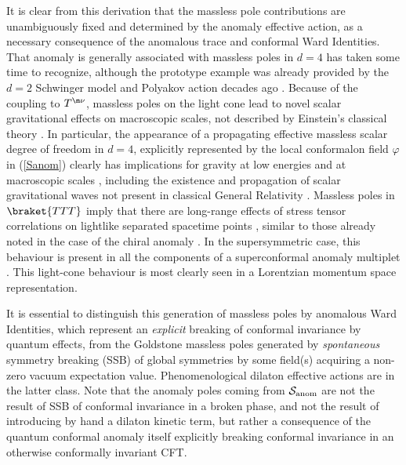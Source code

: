 \documentclass[a4paper,11pt,openright,twoside]{book}
\let\n=\nu      \let\x=\xi     \let\p=\pi      \let\r=\rho
\numberwithin{equation}{section}
\begin{document}
{{It is clear from this derivation that the massless pole contributions are unambiguously fixed and 
determined by the anomaly effective action, as a necessary consequence of the anomalous trace and conformal Ward Identities. 
That anomaly is generally associated with massless poles in $d=4$ has taken some time to recognize, although the prototype example was already provided by the $d=2$ Schwinger model and Polyakov action decades ago \cite{Blaschke:2014ioa}. Because of the coupling 
to $T^{\m\n}$, massless poles on the light cone lead to novel scalar gravitational effects on macroscopic scales, 
not described by Einstein's classical theory \cite{Mottola:2016mpl, Mottola:2006ew,AndMolMott:2003,Meissner:2016onk}. 
In particular, the appearance of a propagating effective massless scalar degree of freedom in $d=4$, explicitly represented by the local 
conformalon field $\varphi$ in (\ref{Sanom}) clearly has implications for gravity at low energies and at macroscopic scales \cite{Mottola:2006ew}, 
including the existence and propagation of scalar gravitational waves not present in classical General Relativity \cite{Mottola:2016mpl}.
Massless poles in $\braket{TTT}$ imply that there are long-range effects of stress tensor correlations on lightlike separated 
spacetime points \cite{Giannotti:2008cv,Armillis:2009pq}, similar to those already noted in the case of the chiral anomaly 
\cite{Giannotti:2008cv,Armillis:2009sm,Coriano:2008pg}. In the supersymmetric case, this behaviour is present in all the components of a superconformal anomaly multiplet \cite{Coriano:2014gja}. This light-cone behaviour is most clearly seen in a Lorentzian
momentum space representation.

It is essential to distinguish this generation of massless poles by anomalous Ward Identities, which represent an {\it explicit} 
breaking of conformal invariance by quantum effects, from the Goldstone massless poles generated by {\it spontaneous} 
symmetry breaking (SSB) of global symmetries by some field(s) acquiring a non-zero vacuum expectation value.  
Phenomenological dilaton effective actions are in the latter class. Note that the anomaly poles coming from $\mathcal{S}_{\rm anom}$ 
are not the result of SSB of conformal invariance in a broken phase, and not the result of introducing by hand a dilaton kinetic term, but rather a consequence of the quantum conformal anomaly itself explicitly breaking conformal invariance in
an otherwise conformally invariant CFT. 

}}
\end{document}
